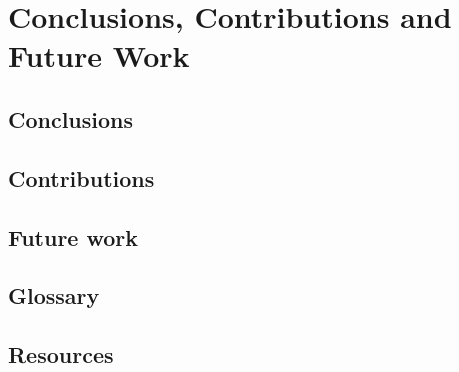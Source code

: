 
\chapter{Conclusions, Contributions and Future Work}

\section{Conclusions}
\section{Contributions}
\section{Future work}
\section{Glossary}
\section{Resources}

